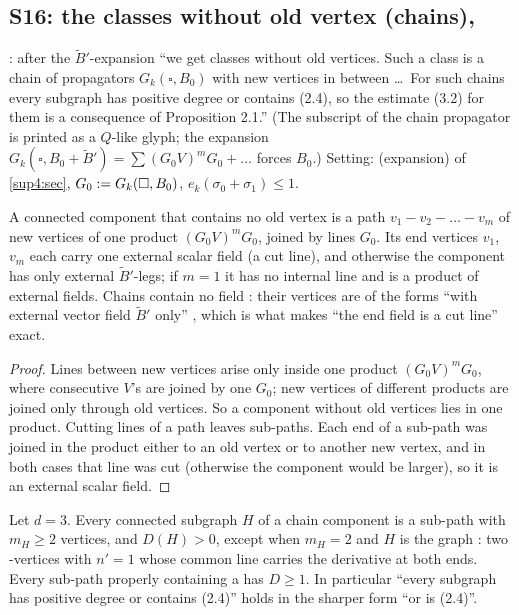 
\subsection{S16: the classes without old vertex (chains), \cite[p.~433]{Ba3}}\label{sup4:ssec:S16}

\cite[p.~433]{Ba3}: after the $\tilde B'$-expansion ``we get classes without old vertices. Such a class is a chain of propagators $G_k(\square,B_0)$ with new vertices in between \dots\ For such chains every subgraph has positive degree or contains (2.4), so the estimate (3.2) for them is a consequence of Proposition 2.1.'' (The subscript of the chain propagator is printed as a $Q$-like glyph; the expansion $G_k(\square,B_0+\tilde B')=\sum(G_0V)^mG_0+\dots$ forces $B_0$.) Setting: (expansion) of \cref{sup4:sec}, $G_0:= G_k(\square,B_0)$, $e_k(\sigma_0+\sigma_1)\le1$.

\begin{lemma}\label{sup4:lem:S161}
A connected component that contains no old vertex is a path $v_1-v_2-\dots-v_m$ of new vertices of one product $(G_0V)^mG_0$, joined by lines $G_0$. Its end vertices $v_1$, $v_m$ each carry one external scalar field (a cut line), and otherwise the component has only external $\tilde B'$-legs; if $m=1$ it has no internal line and is a product of external fields. Chains contain no field \cite[(1.12)]{Ba3}: their vertices are of the forms \cite[(1.8)--(1.11), (1.13)--(1.15)]{Ba3} ``with external vector field $\tilde B'$ only'' \cite[p.~433]{Ba3}, which is what makes ``the end field is a cut line'' exact.
\end{lemma}

\begin{proof}
Lines between new vertices arise only inside one product $(G_0V)^mG_0$, where consecutive $V$'s are joined by one $G_0$; new vertices of different products are joined only through old vertices. So a component without old vertices lies in one product. Cutting lines of a path leaves sub-paths. Each end of a sub-path was joined in the product either to an old vertex or to another new vertex, and in both cases that line was cut (otherwise the component would be larger), so it is an external scalar field.
\end{proof}

\begin{lemma}\label{sup4:lem:S162}
Let $d=3$. Every connected subgraph $H$ of a chain component is a sub-path with $m_H\ge2$ vertices, and $D(H)>0$, except when $m_H=2$ and $H$ is the graph \cite[(2.4)]{Ba3}: two \cite[(1.8)]{Ba3}-vertices with $n'=1$ whose common line carries the derivative at both ends. Every sub-path properly containing a \cite[(2.4)]{Ba3} has $D\ge1$. In particular ``every subgraph has positive degree or contains (2.4)'' holds in the sharper form ``or is (2.4)''.
\end{lemma}

